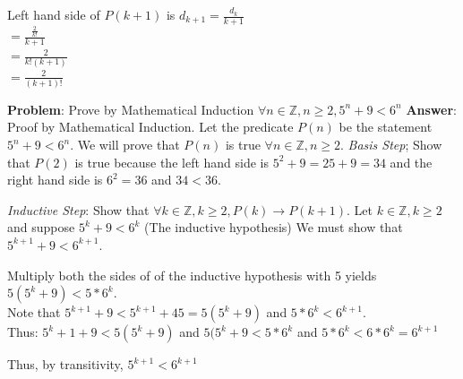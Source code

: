 \documentclass[12pt]{minimal}
\begin{document}
\noindent
Left hand side of $P(k+1)$ is $d_{k+1} = \frac{d_k}{k + 1}$ \\
$= \frac{\frac{2}{k!}}{k + 1}$ \\
$= \frac{2}{k!(k + 1)}$ \\
$= \frac{2}{(k+1)!}$

\textbf{Problem}: Prove by Mathematical Induction $\forall n \in \mathbb{Z}, n ≥ 2, 5^n + 9 < 6^n$
\textbf{Answer}: Proof by Mathematical Induction.
Let the predicate $P(n)$  be the statement $5^n + 9 < 6^n$.
We will prove that $P(n)$ is true $\forall n \in \mathbb{Z}, n ≥ 2$.
\textit{Basis Step}; Show that $P(2)$ is true because the left hand side is $5^2 + 9 = 25 + 9 = 34$ and the right hand side is $6^2 = 36$ and $34 < 36$.

\textit{Inductive Step}: Show that $\forall k \in \mathbb{Z}, k ≥ 2, P(k) \rightarrow P(k + 1)$.
Let $k \in \mathbb{Z}, k ≥ 2$ and suppose $5^k + 9 < 6^k $ (The inductive hypothesis)
We must show that $5^{k+1} + 9 < 6^{k+1}$.


\noindent
Multiply both the sides of of the inductive hypothesis with 5 yields $5(5^k + 9) < 5 * 6^k $. \\
Note that $5^{k + 1} + 9 < 5^{k + 1} + 45 = 5(5^k + 9)$ and $5 * 6^k < 6^{k+1}$. \\
Thus: $5^k + 1 + 9 < 5(5^k + 9)$ and $5(5^k + 9 < 5*6^k$ and $5*6^k < 6*6^k = 6^{k + 1}$

Thus, by transitivity, $5^{k + 1} < 6^{k + 1}$
\end{document}
